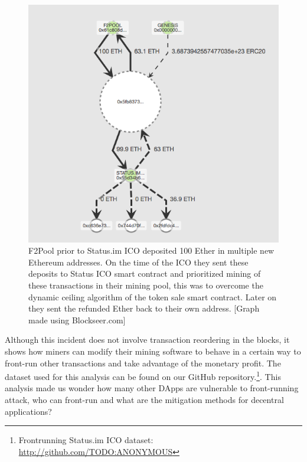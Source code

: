 \begin{figure}[h]
\centering
\includegraphics[width=0.7\linewidth]{figures/F2Pool_transactions_to_StatusICO_and_Refunds.png}
\caption{F2Pool prior to Status.im ICO deposited 100 Ether in multiple new Ethereum addresses. On the time of the ICO they sent these deposits to Status ICO smart contract and prioritized mining of these transactions in their mining pool, this was to overcome the dynamic ceiling algorithm of the token sale smart contract. Later on they sent the refunded Ether back to their own address. [Graph made using Blockseer.com] \label{fig:f2poolfront-run}}
\end{figure}


Although this incident does not involve transaction reordering in the blocks, it shows how miners can modify their mining software to behave in a certain way to front-run other transactions and take advantage of the monetary profit. The dataset used for this analysis can be found on our GitHub repository.\footnote{Frontrunning Status.im ICO dataset: \url{http://github.com/TODO:ANONYMOUS}}. This analysis made us wonder how many other DApps are vulnerable to front-running attack, who can front-run and what are the mitigation methods for decentral applications?




